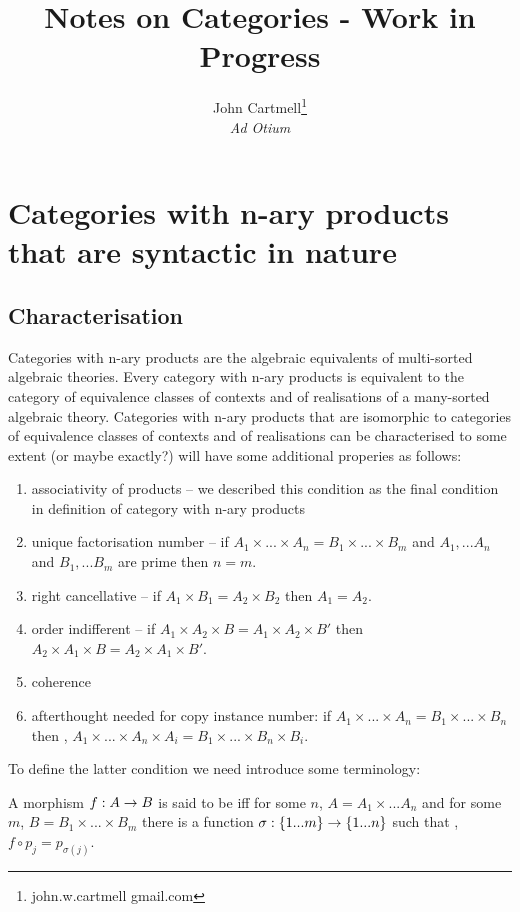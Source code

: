 \documentclass[10pt,a4paper]{scrartcl}
\title{Notes on Categories - Work in Progress}
\author{John Cartmell\footnote{john.w.cartmell gmail.com}\\ \normalsize{\textit{Ad Otium}}}
\begin{document}
\section{Categories with n-ary products that are syntactic in nature}
\subsection{Characterisation}
Categories with n-ary products are the algebraic equivalents of multi-sorted algebraic theories.
Every category with n-ary products is equivalent to the category of equivalence classes 
of contexts and of realisations of a many-sorted algebraic theory. Categories with n-ary products that are isomorphic to categories of equivalence classes 
of contexts and of realisations can be characterised to some extent (or maybe exactly?)
will have some additional properies as follows:
\begin{enumerate}
\item associativity of products -- we described this condition as the final condition in definition of category with n-ary products
\item unique factorisation number -- if $A_1 \times ... \times A_n=B_1 \times ... \times B_m$
and $A_1,...A_n$ and $B_1,...B_m$ are prime then $n=m$.
\item right cancellative -- if $A_1 \times B_1 = A_2 \times B_2$ then $A_1 = A_2$. 
\item order indifferent -- if $A_1 \times A_2 \times B = A_1 \times A_2 \times B'$ then
$A_2 \times A_1 \times B = A_2 \times A_1 \times B'$.
\item coherence
\item afterthought needed for copy instance number:
if $A_1 \times ... \times A_n=B_1 \times ... \times B_n$ then \foreachi, 
$A_1 \times ... \times A_n \times A_i = B_1 \times ... \times B_n \times B_i$.
\end{enumerate}

To define the latter condition we need introduce some terminology:

\begin{definition}
A morphism $f:A \rightarrow B$ is said to be  iff for some $n$,
$A=A_1 \times ... A_n$ and for some $m$, $B=B_1 \times ... \times B_m$
 there is a function 
$\sigma: \left\{1...m\right\} \rightarrow \left\{1...n\right\}$               
such that \foreachj, $f \circ p_j = p_{\sigma(j)}$. 
\end{definition}
\end{document}
